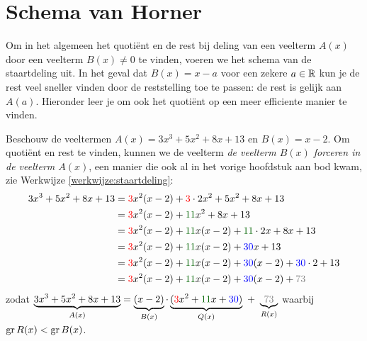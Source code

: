 \documentclass{ximera}
\begin{document}
\section{Schema van Horner}

Om in het algemeen het quoti\"ent en de rest bij deling van een veelterm $A(x)$ door een veelterm $B(x) \neq 0$ te vinden, voeren we het schema van de staartdeling uit. In het geval dat $B(x) = x-a$ voor een zekere $a \in \mathbb{R}$ kun je de rest veel sneller vinden door de reststelling toe te passen: de rest is gelijk aan $A(a)$. Hieronder leer je om ook het quoti\"ent op een meer efficiente manier te vinden. 

\begin{werkwijze}
Beschouw de veeltermen $A(x) = 3x^3+5x^2+8x+13$ en $B(x) = x-2$. Om quoti\"ent en rest te vinden, kunnen we de veelterm 
{\em de veelterm $B(x)$ forceren in de veelterm $A(x)$}, een manier die ook al in het vorige hoofdstuk aan bod kwam, zie Werkwijze \ref{werkwijze:staartdeling}:
\begin{align*}
3x^3+5x^2+8x+13
& = {\mathcolor{red}{3}}x^2(x-2) + {\mathcolor{red}{3}}\cdot 2x^2 + 5x^2 + 8x + 13 \\
& = {\mathcolor{red}{3}}x^2(x-2) + {\mathcolor{graf}{11}}x^2 + 8x + 13 \\
& = {\mathcolor{red}{3}}x^2(x-2) + {\mathcolor{graf}{11}}x(x-2) + {\mathcolor{graf}{11}}\cdot 2x + 8x + 13 \\
& = {\mathcolor{red}{3}}x^2(x-2) + {\mathcolor{graf}{11}}x(x-2) + {\mathcolor{blue}{30}}x + 13 \\
& = {\mathcolor{red}{3}}x^2(x-2) + {\mathcolor{graf}{11}}x(x-2) + {\mathcolor{blue}{30}}(x-2) + {\mathcolor{blue}{30}} \cdot 2 + 13 \\
& = {\mathcolor{red}{3}}x^2(x-2) + {\mathcolor{graf}{11}}x(x-2) + {\mathcolor{blue}{30}}(x-2) + {\mathcolor{gray}{73}} %
\end{align*}
zodat $\D \underbrace{3x^3+5x^2+8x+13}_{A(x)} = \underbrace{(x-2)}_{B(x)}\cdot\underbrace{({\mathcolor{red}{3}}x^2 + {\mathcolor{graf}{11}}x + {\mathcolor{blue}{30}})}_{Q(x)} \,\, + \,\, \underbrace{{\mathcolor{gray}{73}}}_{R(x)}$ waarbij $\operatorname{gr} R(x) < \operatorname{gr} B(x)$.


\end{werkwijze}
\end{document}
